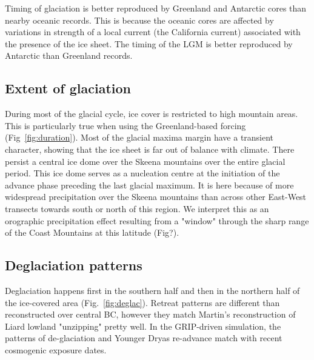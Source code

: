 \documentclass[tc, ms]{copernicus}
\begin{document}
Timing of glaciation is better reproduced by Greenland and Antarctic cores than
nearby oceanic records. This is because the oceanic cores are affected by
variations in strength of a local current (the California current) associated
with the presence of the ice sheet. The timing of the LGM is better reproduced
by Antarctic than Greenland records.

\subsection{Extent of glaciation}

During most of the glacial cycle, ice cover is restricted to high mountain
areas. This is particularly true when using the Greenland-based forcing
(Fig~\ref{fig:duration}). Most of the glacial maxima margin have a transient
character, showing that the ice sheet is far out of balance with climate. There
persist a central ice dome over the Skeena mountains over the entire glacial
period. This ice dome serves as a nucleation centre at the initiation of the
advance phase preceding the last glacial maximum. It is here because of more
widespread precipitation over the Skeena mountains than across other East-West
transects towards south or north of this region. We interpret this as an
orographic precipitation effect resulting from a "window" through the sharp
range of the Coast Mountains at this latitude (Fig?).

\subsection{Deglaciation patterns}

Deglaciation happens first in the southern half and then in the northern half
of the ice-covered area (Fig.~\ref{fig:deglac}). Retreat patterns are different
than reconstructed over central BC, however they match Martin's reconstruction
of Liard lowland "unzipping" pretty well. In the GRIP-driven simulation, the
patterns of de-glaciation and Younger Dryas re-advance match with recent
cosmogenic exposure dates.

\conclusions
\label{sec:concl}

\end{document}
